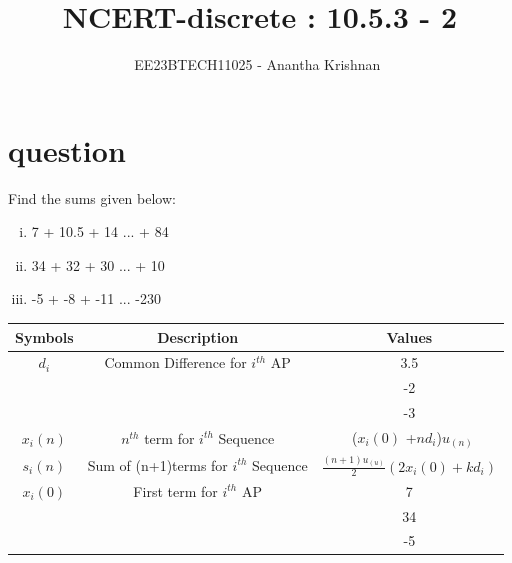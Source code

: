 \documentclass[journal,12pt,onecolumn]{IEEEtran}
\theoremstyle{remark}
\begin{document}

\vspace{3cm}

\title{NCERT-discrete : 10.5.3 - 2}
\author{EE23BTECH11025 - Anantha Krishnan $^{}$%
}
\maketitle
\bigskip



\section{question}
\vspace{0.5cm}
Find the sums given below:
\begin{enumerate}[(i)]
    \item  7 + 10.5 + 14 ... + 84
    \item  34 + 32 + 30 ... + 10
    \item  -5 + -8 + -11 ... -230
\end{enumerate}

 \vspace{0.5cm}
\begin{enumerate}
\begin{tabular}{ |c|c|c| } 
 \hline
Symbols & Description & Values  \\
 \hline
$d_i$ & Common Difference for $i^{th}$ AP & 3.5 \\ \cline{3-3}
 & & -2 \\ \cline{3-3}
 & & -3 \\ 
\hline

  $x_i(n)$ & $n^{th}$ term for $i^{th}$ Sequence & \ ($x_i(0)$ +$nd_i$)$u_{(n)}$\\
  \hline

   $s_i(n)$ & Sum of (n+1)terms for $i^{th}$ Sequence & $\frac{(n+1)u_{(u)}}{2}(2x_i(0) + kd_i)$\\
   \hline

  $x_i(0)$ & First term for $i^{th}$ AP & 7 \\ \cline{3-3}
 & & 34 \\ \cline{3-3}
 & & -5 \\ 
\hline
  
   \hline
\end{tabular}
\end{enumerate}
\centering
\captionsetup{Table 1 : Parameters , Descriptions And Values }
\label{table:ee25-tab1}
\vspace{0.5cm}
\end{document}
